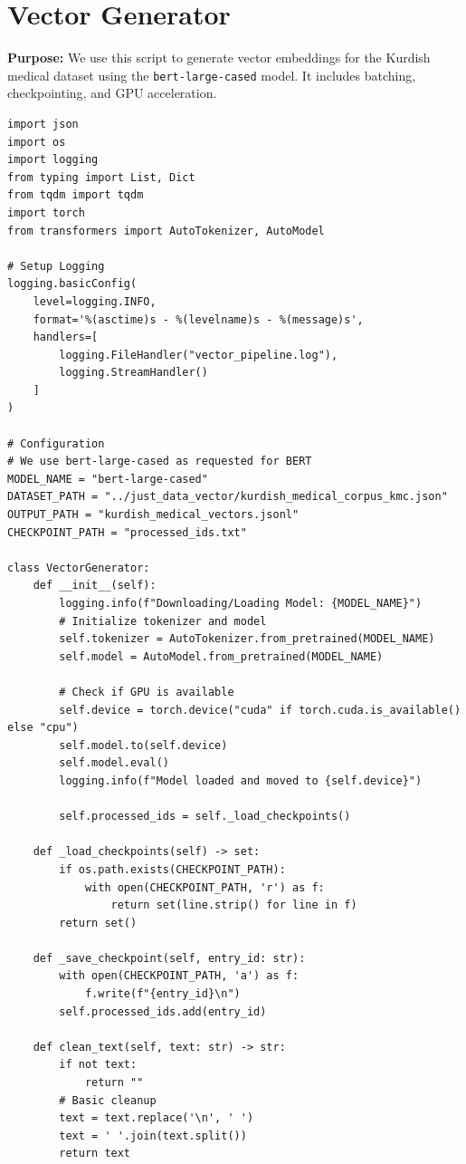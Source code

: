 \documentclass[11pt]{article}
\begin{document}
\clearpage

\section{Vector Generator} \label{sec:generator}
\textbf{Purpose:} We use this script to generate vector embeddings for the Kurdish medical dataset using the \texttt{bert-large-cased} model. It includes batching, checkpointing, and GPU acceleration.

\begin{lstlisting}[style=pythoncode, caption={vector\_generator.py}]
import json
import os
import logging
from typing import List, Dict
from tqdm import tqdm
import torch
from transformers import AutoTokenizer, AutoModel

# Setup Logging
logging.basicConfig(
    level=logging.INFO,
    format='%(asctime)s - %(levelname)s - %(message)s',
    handlers=[
        logging.FileHandler("vector_pipeline.log"),
        logging.StreamHandler()
    ]
)

# Configuration
# We use bert-large-cased as requested for BERT
MODEL_NAME = "bert-large-cased"
DATASET_PATH = "../just_data_vector/kurdish_medical_corpus_kmc.json"
OUTPUT_PATH = "kurdish_medical_vectors.jsonl"
CHECKPOINT_PATH = "processed_ids.txt"

class VectorGenerator:
    def __init__(self):
        logging.info(f"Downloading/Loading Model: {MODEL_NAME}")
        # Initialize tokenizer and model
        self.tokenizer = AutoTokenizer.from_pretrained(MODEL_NAME)
        self.model = AutoModel.from_pretrained(MODEL_NAME)
        
        # Check if GPU is available
        self.device = torch.device("cuda" if torch.cuda.is_available() else "cpu")
        self.model.to(self.device)
        self.model.eval()
        logging.info(f"Model loaded and moved to {self.device}")
        
        self.processed_ids = self._load_checkpoints()

    def _load_checkpoints(self) -> set:
        if os.path.exists(CHECKPOINT_PATH):
            with open(CHECKPOINT_PATH, 'r') as f:
                return set(line.strip() for line in f)
        return set()

    def _save_checkpoint(self, entry_id: str):
        with open(CHECKPOINT_PATH, 'a') as f:
            f.write(f"{entry_id}\n")
        self.processed_ids.add(entry_id)

    def clean_text(self, text: str) -> str:
        if not text:
            return ""
        # Basic cleanup
        text = text.replace('\n', ' ')
        text = ' '.join(text.split())
        return text


\end{lstlisting}
\end{document}
